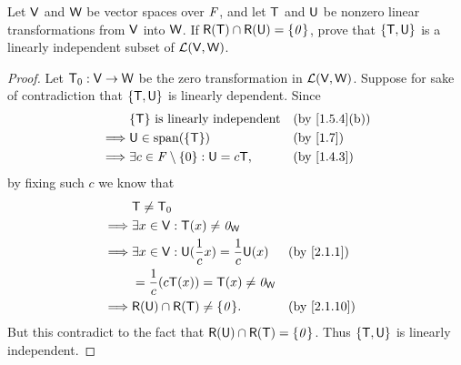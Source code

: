 \begin{ex}\label{ex:2.2.13}
  Let \(\mathsf{V}\) and \(\mathsf{W}\) be vector spaces over \(\mathit{F}\), and let \(\mathsf{T}\) and \(\mathsf{U}\) be nonzero linear transformations from \(\mathsf{V}\) into \(\mathsf{W}\).
  If \(\rg{\T} \cap \rg{\U} = \set{\zv}\), prove that \(\left\lbrace\mathsf{T}, \mathsf{U}\right\rbrace\) is a linearly independent subset of \(\mathcal{L}(\mathsf{V}, \mathsf{W})\).
\end{ex}

\begin{proof}
  Let \(\mathsf{T}_0 : \mathsf{V} \to \mathsf{W}\) be the zero transformation in \(\mathcal{L}(\mathsf{V}, \mathsf{W})\).
  Suppose for sake of contradiction that \(\left\lbrace\mathsf{T}, \mathsf{U}\right\rbrace\) is linearly dependent.
  Since
  \begin{align*}
             & \set{\T} \text{ is linearly independent}        &  & \text{(by \cref{1.5.4}(b))} \\
    \implies & \U \in \spn{\set{\T}}                           &  & \text{(by \cref{1.7})}      \\
    \implies & \exists c \in \F \setminus \set{0} : \U = c \T, &  & \text{(by \cref{1.4.3})}
  \end{align*}
  by fixing such \(c\) we know that
  \begin{align*}
             & \T \neq \zT                                                                             \\
    \implies & \exists x \in \V : \T(x) \neq \zv_{\W}                                                  \\
    \implies & \exists x \in \V : \U(\frac{1}{c} x) = \frac{1}{c} \U(x) &  & \text{(by \cref{2.1.1})}  \\
             & = \frac{1}{c} (c \T(x)) = \T(x) \neq \zv_{\W}                                           \\
    \implies & \rg{\U} \cap \rg{\T} \neq \set{\zv}.                     &  & \text{(by \cref{2.1.10})}
  \end{align*}
  But this contradict to the fact that \(\rg{\U} \cap \rg{\T} = \set{\zv}\).
  Thus \(\left\lbrace\mathsf{T}, \mathsf{U}\right\rbrace\) is linearly independent.
\end{proof}
